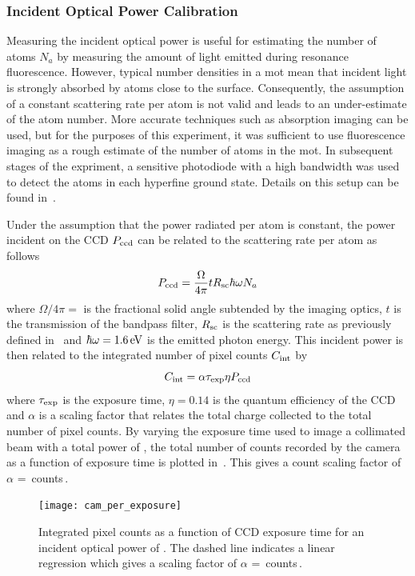 \subsubsection{Incident Optical Power Calibration} 
Measuring the incident optical power is useful for estimating the number of atoms \(N_a\) by measuring the amount of light emitted during resonance fluorescence. However, typical number densities in a \ac{mot} mean that incident light is strongly absorbed by atoms close to the surface. Consequently, the
assumption of a constant scattering rate per atom is not valid and leads to an
under-estimate of the atom number. More accurate techniques such as absorption imaging can be used, but for the purposes of this experiment, it was
sufficient to use fluorescence imaging as a rough estimate of the
number of atoms in the \ac{mot}. In subsequent stages of the expriment, a sensitive photodiode with a high bandwidth was used to detect the atoms in each hyperfine ground state. Details on this setup can
be found in~. \par\noindent
Under the assumption that the
power radiated per atom is constant, the power incident on the CCD
\(P_\textnormal{ccd}\) can be related to the scattering rate per atom as follows
\begin{equation}
	P_\textnormal{ccd} = \frac{\Omega}{4\pi} t R_\textnormal{sc}  \hbar \omega N_a
\end{equation}
where $\Omega/4\pi = $ is the fractional solid angle subtended by
the imaging optics, \(t\) is the transmission of the bandpass filter,
\(R_\textnormal{sc}\) is the scattering rate as previously defined
in~ and \(\hbar \omega =
\sivalue{1.6}{\electronvolt}\) is the emitted photon energy. This incident power
is then related to the integrated number of pixel counts \(C_\textnormal{int}\)
by
\begin{equation}
	C_\textnormal{int} = \alpha \tau_\textnormal{exp} \eta P_\textnormal{ccd}
\end{equation}
where \(\tau_\textnormal{exp}\) is the exposure time, \(\eta = 0.14\) is the
quantum efficiency of the CCD and \(\alpha\) is a scaling factor that relates
the total charge collected to the total number of pixel counts. By varying the
exposure time used to image a collimated beam with a total power of
, the total number of counts recorded by the camera
as a function of exposure time is plotted in~. This
gives a count scaling factor of \(\alpha\) =
\,counts\,\sivalue{}{\per\micro\second\per\micro\watt}.
\begin{figure}[!htbp]
	\centering
	\texttt{[image: cam\_per\_exposure]}
	\caption[Integrated pixel counts as a function of CCD exposure
		time.]{Integrated pixel counts as a function of CCD exposure time for an
		incident optical power of . The dashed line
		indicates a linear regression which gives a scaling factor of \(\alpha\)
		=
		\,counts\,\sivalue{}{\per\micro\second\per\micro\watt}.}
	\label{fig:camera_counts}
\end{figure}


